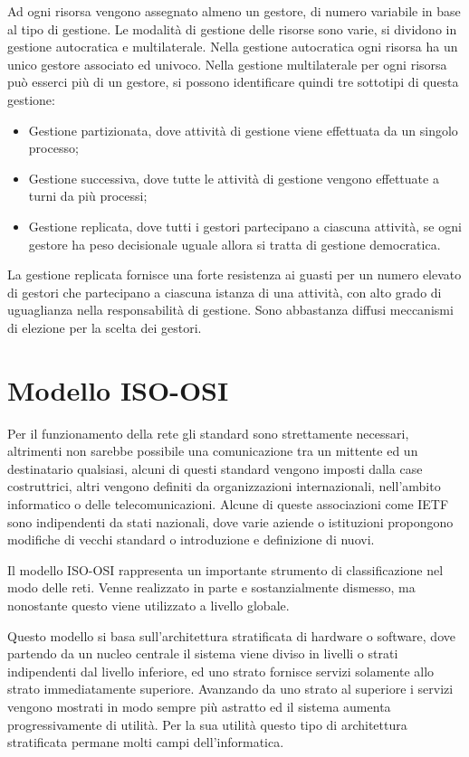 \documentclass{article}
\numberwithin{equation}{subsection}
\begin{document}
Ad ogni risorsa vengono assegnato almeno un gestore, di numero variabile in base al tipo di gestione. 
Le modalità di gestione delle risorse sono varie, si dividono in gestione autocratica e multilaterale. Nella gestione autocratica ogni risorsa ha un unico gestore 
associato ed univoco. Nella gestione multilaterale per ogni risorsa può esserci più di un gestore, si possono identificare quindi tre sottotipi di questa gestione:
\begin{itemize}
  \item Gestione partizionata, dove attività di gestione viene effettuata da un singolo processo;
  \item Gestione successiva, dove tutte le attività di gestione vengono effettuate a turni da più processi;
  \item Gestione replicata, dove tutti i gestori partecipano a ciascuna attività, se ogni gestore ha peso decisionale uguale allora si tratta di gestione democratica. 
\end{itemize}

La gestione replicata fornisce una forte resistenza ai guasti per un numero elevato di gestori che partecipano a ciascuna istanza di una attività, con alto grado di 
uguaglianza nella responsabilità di gestione. Sono abbastanza diffusi meccanismi di elezione per la scelta dei gestori. 

\clearpage

\section{Modello ISO-OSI}

Per il funzionamento della rete gli standard sono strettamente necessari, altrimenti non sarebbe possibile una comunicazione tra un mittente ed un destinatario qualsiasi, 
alcuni di questi standard vengono imposti dalla case costruttrici, altri vengono definiti da organizzazioni internazionali, nell'ambito informatico o delle 
telecomunicazioni. Alcune di queste associazioni come IETF sono indipendenti da stati nazionali, dove varie aziende o istituzioni propongono modifiche di vecchi 
standard o introduzione e definizione di nuovi. 

Il modello ISO-OSI rappresenta un importante strumento di classificazione nel modo delle reti. Venne realizzato in parte e sostanzialmente dismesso, ma nonostante 
questo viene utilizzato a livello globale. 

Questo modello si basa sull'architettura stratificata di hardware o software, dove partendo da un nucleo centrale il sistema viene diviso in livelli o strati 
indipendenti dal livello inferiore, ed uno strato fornisce servizi solamente allo strato immediatamente superiore. Avanzando da uno strato al superiore i servizi vengono mostrati in modo 
sempre più astratto ed il sistema aumenta progressivamente di utilità. Per la sua utilità questo tipo di architettura stratificata permane molti campi dell'informatica. 
\end{document}

